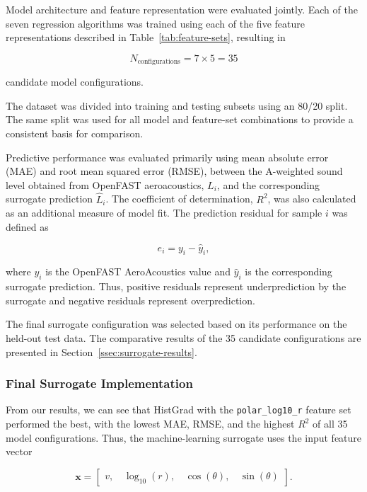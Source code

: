\documentclass[11pt]{article}
\begin{document}
Model architecture and feature representation were evaluated jointly. Each of the seven regression algorithms was trained using each of the five feature representations described in Table~\ref{tab:feature-sets}, resulting in

\begin{equation}
    N_{\mathrm{configurations}}
    = 7 \times 5
    = 35
\end{equation}

candidate model configurations.

The dataset was divided into training and testing subsets using an 80/20 split. The same split was used for all model and feature-set combinations to provide a consistent basis for comparison.

Predictive performance was evaluated primarily using mean absolute error (MAE) and root mean squared error (RMSE), between the A-weighted sound level obtained from OpenFAST aeroacoustics, $L_i$, and the corresponding surrogate prediction $\hat{L}_i$. The coefficient of determination, $R^2$, was also calculated as an additional measure of model fit. The prediction residual for sample $i$ was defined as

\begin{equation}
    e_i = y_i - \hat{y}_i,
    \label{eq:residual}
\end{equation}

where $y_i$ is the OpenFAST AeroAcoustics value and $\hat{y}_i$ is the corresponding surrogate prediction. Thus, positive residuals represent underprediction by the surrogate and negative residuals represent overprediction.

The final surrogate configuration was selected based on its performance on the held-out test data. The comparative results of the 35 candidate configurations are presented in Section~\ref{ssec:surrogate-results}.

\subsubsection{Final Surrogate Implementation}

From our results, we can see that HistGrad with the \verb|polar_log10_r| feature set performed the best, with the lowest MAE, RMSE, and the highest $R^2$ of all 35 model configurations. Thus, the machine-learning surrogate uses the input feature vector

\begin{equation}
    \mathbf{x}
    =
    \begin{bmatrix}
        v,\, &
        \log_{10}(r),\, &
        \cos(\theta),\, &
        \sin(\theta)
    \end{bmatrix}.
\end{equation}
\end{document}
